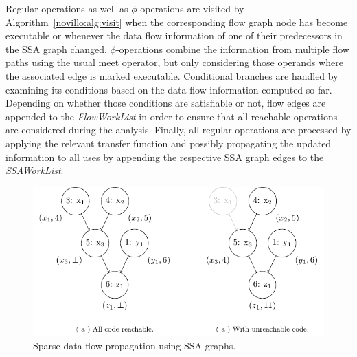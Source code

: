 Regular operations as well as $\phi$-operations are visited by
Algorithm~\ref{novillo:alg:visit} when the corresponding flow graph node has
become executable or whenever the data flow information of one of their
predecessors in the SSA graph changed. $\phi$-operations combine the information
from multiple flow paths using the usual meet operator, but only considering
those operands where the associated edge is marked executable. Conditional
branches are handled by examining its conditions based on the data flow
information computed so far. Depending on whether those conditions are
satisfiable or not, flow edges are appended to the \emph{FlowWorkList} in order
to ensure that all reachable operations are considered during the analysis.
Finally, all regular operations are processed by applying the relevant transfer
function and possibly propagating the updated information to all uses by
appending the respective SSA graph edges to the \emph{SSAWorkList}.

\begin{figure}[t!]
  \begin{center}
    \includegraphics{ssa_propagation}
    \subfigure{\label{novillo:fig:ssa_propagation:a}}
    \subfigure{\label{novillo:fig:ssa_propagation:b}}
  \end{center}
  \vspace{-2em}
  \caption{Sparse data flow propagation using SSA graphs.}
  \label{novillo:fig:ssa_propagation}
\end{figure}

